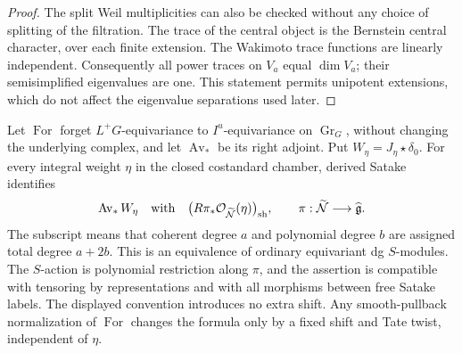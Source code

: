 \begin{proof}
The split Weil multiplicities can also be checked without any
choice of splitting of the filtration. The trace of the central
object is the Bernstein central character, over each finite
extension. The Wakimoto trace functions are linearly independent.
Consequently all power traces on $V_a$ equal $\dim V_a$;
their semisimplified eigenvalues are one. This statement permits
unipotent extensions, which do not affect the eigenvalue
separations used later.
\end{proof}

\begin{proposition}\label{cat:springer}
Let $\operatorname{For}$ forget $L^+G$-equivariance to
$I^u$-equivariance on $\operatorname{Gr}_G$, without changing the
underlying complex, and let $\operatorname{Av}_*$ be its right
adjoint. Put $W_\eta=J_\eta\star\delta_0$. For every integral
weight $\eta$ in the closed costandard chamber, derived Satake
identifies
\[
 \operatorname{Av}_*W_\eta
 \quad\text{with}\quad
 \bigl(R\pi_*\mathcal O_{\widetilde{\mathcal N}}(\eta)\bigr)_{\rm sh},
 \qquad
 \pi:\widetilde{\mathcal N}\longrightarrow\widehat{\mathfrak g}.
\]
The subscript means that coherent degree $a$ and polynomial degree
$b$ are assigned total degree $a+2b$. This is an equivalence of
ordinary equivariant dg $S$-modules. The $S$-action is polynomial
restriction along $\pi$, and the assertion is compatible with
tensoring by representations and with all morphisms between free
Satake labels. The displayed convention introduces no extra shift.
Any smooth-pullback normalization of $\operatorname{For}$ changes
the formula only by a fixed shift and Tate twist, independent of
$\eta$.
\end{proposition}

